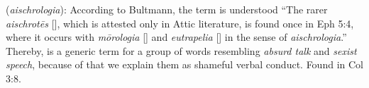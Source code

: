 \item[Shameful talk,]

(\textit{aischrologia}):
According to Bultmann, the term is understood ``The rarer \emph{aischrotēs} [], which is attested only in Attic literature, is found once in Eph 5:4, where it occurs with \emph{mōrologia} [] and \emph{eutrapelia} [] in the sense of \emph{aischrologia}.'' 
Thereby,  is a generic term for a group of words resembling \emph{absurd talk} and \emph{sexist speech}, because of that we explain them as shameful verbal conduct.
Found in Col 3:8.
